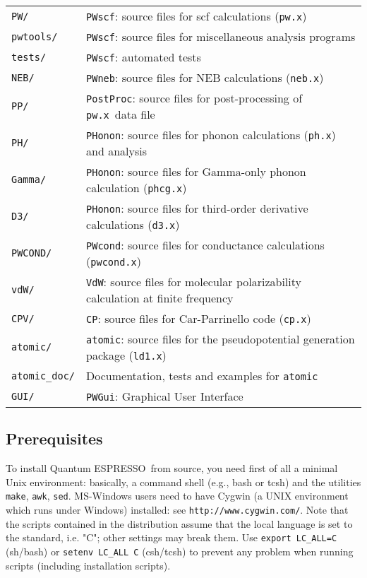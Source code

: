 \documentclass[12pt,a4paper]{article}
\def\qe{{\sc Quantum ESPRESSO}}
\def\pw.x{\texttt{pw.x}}
\def\cp.x{\texttt{cp.x}}
\def\ph.x{\texttt{ph.x}}
\def\PWscf{\texttt{PWscf}}
\def\PHonon{\texttt{PHonon}}
\def\CP{\texttt{CP}}
\def\PostProc{\texttt{PostProc}}
\def\make{\texttt{make}}
\begin{document}
\begin{tabular}{ll}
\texttt{PW/}      &\PWscf: source files for scf calculations (\pw.x)\\
\texttt{pwtools/} &\PWscf: source files for miscellaneous analysis programs\\
\texttt{tests/}   &\PWscf:  automated tests\\
\texttt{NEB/}     &\texttt{PWneb}: source files for NEB calculations (\texttt{neb.x})\\
\texttt{PP/}      &\PostProc: source files for post-processing of \pw.x\
                   data file\\
\texttt{PH/}      &\PHonon: source files for phonon calculations (\ph.x)
                   and analysis\\
\texttt{Gamma/}  &\PHonon: source files for Gamma-only phonon calculation
                  (\texttt{phcg.x})\\
\texttt{D3/}     &\PHonon: source files for third-order derivative 
                  calculations (\texttt{d3.x})\\
\texttt{PWCOND/} &\texttt{PWcond}: source files for conductance calculations
                  (\texttt{pwcond.x})\\
\texttt{vdW/}    &\texttt{VdW}: source files for molecular polarizability
                  calculation at finite frequency\\
\texttt{CPV/}    &\CP: source files for Car-Parrinello code (\cp.x)\\
\texttt{atomic/} &\texttt{atomic}: source files for the pseudopotential
                   generation package (\texttt{ld1.x})\\
\texttt{atomic\_doc/} &Documentation, tests and examples for \texttt{atomic}\\
\texttt{GUI/}    & \texttt{PWGui}: Graphical User Interface\\
\end{tabular}

\subsection{Prerequisites}
\label{Sec:Installation}

To install \qe\ from source, you need first of all a minimal Unix 
environment: basically, a command shell (e.g.,
bash or tcsh) and the utilities \make, \texttt{awk}, \texttt{sed}.
 MS-Windows users need
to have Cygwin (a UNIX environment which runs under Windows) installed:
see \texttt{http://www.cygwin.com/}. Note that the scripts contained in the distribution
assume that the local  language is set to the standard, i.e. "C"; other
 settings 
may break them. Use \texttt{export LC\_ALL=C} (sh/bash) or
\texttt{setenv LC\_ALL C} (csh/tcsh) to prevent any problem 
when running scripts (including installation scripts).
\end{document}
